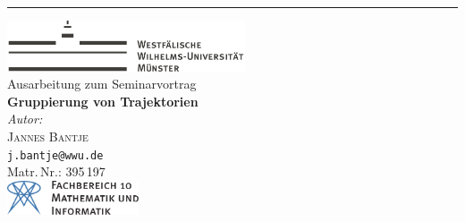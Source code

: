 \begin{titlepage}
\hspace*{0.15\textwidth} %
\rule{2pt}{\textheight} %
\hspace*{0.05\textwidth} %
\begin{minipage}[b]{0.75\textwidth}
	\raggedright
	\includegraphics[height=1.5cm, keepaspectratio]{Bilder/Logo_WWU_Muenster.pdf} \\[2cm]
	{\Large \sffamily Ausarbeitung zum Seminarvortrag}\\[0.5cm]
	{\Huge\sffamily\bfseries Gruppierung von Trajektorien}\\[7cm]
	{\large \textit{Autor:}}\\[5pt]
	{\Large \textsc{Jannes Bantje}}\\[5pt] %
	{\small\nolinkurl{j.bantje@wwu.de}\\ Matr.\,Nr.: 395\,197}\\[2.5cm]
	
	\vspace{0.1\textheight}
	\includegraphics[height=1cm, keepaspectratio]{Bilder/fb10logo.pdf}
\end{minipage}	



\end{titlepage}

